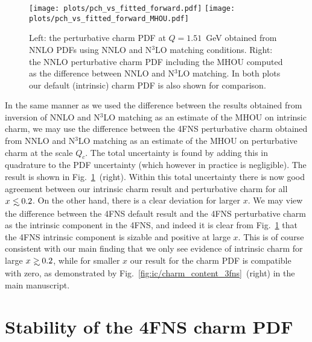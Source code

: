 \begin{figure}[h]
  \begin{center}
    \texttt{[image: plots/pch\_vs\_fitted\_forward.pdf]}
    \texttt{[image: plots/pch\_vs\_fitted\_forward\_MHOU.pdf]}
    \caption{\small Left: the perturbative charm PDF at $Q=1.51$~GeV
  obtained from NNLO PDFs using NNLO and N$^3$LO matching
    conditions.
      Right: the NNLO perturbative charm PDF including the MHOU
    computed as the difference between NNLO and N$^3$LO matching.
In both plots our default (intrinsic) charm PDF is also shown for comparison.  
  \label{fig:ic/charm_fitted_vs_perturbative_mhous} }
\end{center}
\end{figure}

In the same manner as we used the difference between the results obtained from
inversion of NNLO and N$^3$LO  matching as an estimate of the MHOU on
intrinsic charm, we may use the difference between the 4FNS
 perturbative charm obtained from NNLO and N$^3$LO matching as an
 estimate of the MHOU on perturbative charm at the scale $Q_c$.
 The total uncertainty is found by adding
 this in quadrature to the PDF uncertainty (which however in practice
 is negligible).
%
The result is shown in 
Fig.~\ref{fig:ic/charm_fitted_vs_perturbative_mhous}~(right).
Within this total uncertainty there is now good agreement between our
intrinsic charm result and perturbative charm for all
$x\lsim 0.2$. On the other hand, there is a clear deviation for larger
$x$. We may view the difference between the 4FNS default result
and the 4FNS perturbative  charm as the intrinsic component in the
4FNS, and indeed it is clear from
Fig.~\ref{fig:ic/charm_fitted_vs_perturbative_mhous} that the 4FNS
intrinsic component is sizable and positive at large $x$.
%
This is of course consistent with our main finding that we
only see evidence of intrinsic charm for large $x\gsim 0.2$, while for
smaller $x$ our result for the charm PDF is compatible with zero, as demonstrated by
Fig.~\ref{fig:ic/charm_content_3fns}~(right) in the main manuscript.

\clearpage
\section{Stability of the 4FNS charm PDF}
\label{app:ic/charm_stability_4fns}


